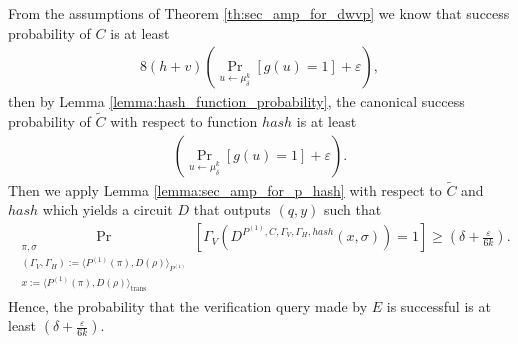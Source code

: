 From the assumptions of Theorem \ref{th:sec_amp_for_dwvp} we know that success probability of $C$ is at least
\begin{align*}
8(h+v)\left(\underset{u \leftarrow \mu_\delta^k}{\Pr}\left[g(u) = 1\right] + \varepsilon\right),
\end{align*}
then by Lemma \ref{lemma:hash_function_probability}, the canonical success
probability of $\widetilde{C}$ with respect to function $hash$ is at least
\begin{align*}
\left(\underset{u \leftarrow \mu_\delta^k}{\Pr}\left[g(u) = 1\right] + \varepsilon\right).
\end{align*}
Then we apply Lemma \ref{lemma:sec_amp_for_p_hash} with respect to $\widetilde{C}$ and $hash$ which yields a circuit $D$ that
outputs $(q, y)$ such that
\begin{align*}
    \underset{\substack{\pi, \sigma \\ (\Gamma_V,\Gamma_H) := \langle P^{(1)}(\pi), D(\rho) \rangle_{P^{(1)}} \\ x := \langle P^{(1)}(\pi), D(\rho) \rangle_{\text{trans}}}}
    {\Pr}\left[\Gamma_V(D^{P^{(1)},C,\Gamma_V, \Gamma_H, hash}(x, \sigma)) = 1\right] \geq (\delta + \frac{\varepsilon}{6k}).
\end{align*}
Hence, the probability that the verification query made by $E$ is successful is at least $(\delta + \frac{\varepsilon}{6k})$.
